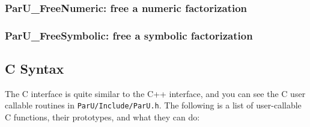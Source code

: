 \documentclass[12pt]{article}
\begin{document}
\subsubsection{{\sf ParU\_FreeNumeric}: free a numeric factorization}
\subsubsection{{\sf ParU\_FreeSymbolic}: free a symbolic factorization}

\subsection{C Syntax}

The C interface is quite similar to the C++ interface, and you can see the C
user callable routines in \verb'ParU/Include/ParU.h'.  The following is a list
of user-callable C functions, their prototypes, and what they can do:
\end{document}
